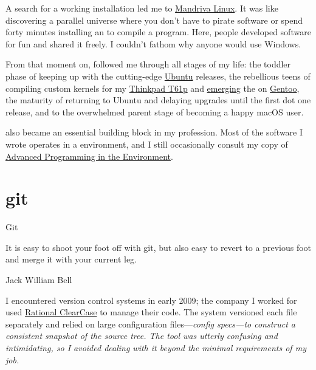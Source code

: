 \documentclass{article}
\begin{document}
A search for a working  installation led me to \href{https://en.wikipedia.org/wiki/Mandriva_Linux}{Mandriva Linux}.
It was like discovering a parallel universe where you don't have to pirate software or spend forty minutes installing an  to compile a  program.
Here, people developed software for fun and shared it freely.
I couldn't fathom why anyone would use Windows.

From that moment on,  followed me through all stages of my life:
the toddler phase of keeping up with the cutting-edge \href{https://ubuntu.com}{Ubuntu} releases,
the rebellious teens of compiling custom kernels for my \href{https://www.thinkwiki.org/wiki/Category:T61p}{Thinkpad T61p} and \href{https://wiki.gentoo.org/wiki/Emerge}{emerging} the \href{https://wiki.gentoo.org/wiki/World_set_(Portage)}{} on \href{https://www.gentoo.org/}{Gentoo},
the maturity of returning to Ubuntu  and delaying upgrades until the first dot one release,
and to the overwhelmed parent stage of becoming a happy macOS user.

 also became an essential building block in my profession.
Most of the software I wrote operates in a  environment, and I still occasionally consult my copy of \href{https://www.goodreads.com/book/show/603263.Advanced_Programming_in_the_UNIX_Environment}{Advanced Programming in the  Environment}.

\section{git}{Git}

\epigraph{
  It is easy to shoot your foot off with git, but also easy to revert to a previous foot and merge it with your current leg.
}{
  Jack William Bell
}

I encountered version control systems in early 2009; the company I worked for used \href{https://en.wikipedia.org/wiki/IBM_Rational_ClearCase}{Rational ClearCase} to manage their code.
The system versioned each file separately and relied on large configuration files---\em{config specs}---to construct a consistent snapshot of the source tree.
The tool was utterly confusing and intimidating, so I avoided dealing with it beyond the minimal requirements of my job.
\end{document}
